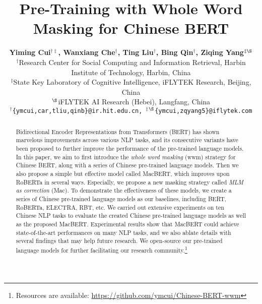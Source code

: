 \documentclass[journal]{IEEEtran}
\begin{document}
\begin{CJK*}{UTF8}{gbsn}
\title{Pre-Training with Whole Word Masking for Chinese BERT}


\author{{\bf Yiming Cui$^{\dag\ddag}$, Wanxiang Che$^\dag$, Ting Liu$^\dag$, Bing Qin$^\dag$, Ziqing Yang$^{\ddag\S}$}   \\ {$^\dag$Research Center for Social Computing and Information Retrieval, Harbin Institute of Technology, Harbin, China}\\
{$^\ddag$State Key Laboratory of Cognitive Intelligence, iFLYTEK Research, Beijing, China}\\
{$^\S$iFLYTEK AI Research (Hebei), Langfang, China} \\
{$^\dag$\tt \{ymcui,car,tliu,qinb\}@ir.hit.edu.cn, $^\ddag$$^\S$\tt\{ymcui,zqyang5\}@iflytek.com}\\  
}





















\maketitle

\begin{abstract}
Bidirectional Encoder Representations from Transformers (BERT) has shown marvelous improvements across various NLP tasks, and its consecutive variants have been proposed to further improve the performance of the pre-trained language models.
In this paper, we aim to first introduce the {\em whole word masking} (wwm) strategy for Chinese BERT, along with a series of Chinese pre-trained language models.
Then we also propose a simple but effective model called MacBERT, which improves upon RoBERTa in several ways.
Especially, we propose a new masking strategy called {\em MLM as correction} (Mac).
To demonstrate the effectiveness of these models, we create a series of Chinese pre-trained language models as our baselines, including BERT, RoBERTa, ELECTRA, RBT, etc.
We carried out extensive experiments on ten Chinese NLP tasks to evaluate the created Chinese pre-trained language models as well as the proposed MacBERT.
Experimental results show that MacBERT could achieve state-of-the-art performances on many NLP tasks, and we also ablate details with several findings that may help future research.
We open-source our pre-trained language models for further facilitating our research community.\footnote{Resources are available: \url{https://github.com/ymcui/Chinese-BERT-wwm}}
\end{abstract}


\end{CJK*}
\end{document}
